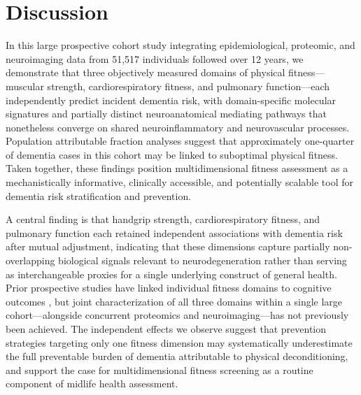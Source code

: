 \documentclass{article}
\begin{document}
\section*{Discussion}

In this large prospective cohort study integrating epidemiological, 
proteomic, and neuroimaging data from 51,517 individuals followed over 
12 years, we demonstrate that three objectively measured domains of 
physical fitness—muscular strength, cardiorespiratory fitness, and 
pulmonary function—each independently predict incident dementia risk, 
with domain-specific molecular signatures and partially distinct 
neuroanatomical mediating pathways that nonetheless converge on shared 
neuroinflammatory and neurovascular processes. Population attributable 
fraction analyses suggest that approximately one-quarter of dementia 
cases in this cohort may be linked to suboptimal physical fitness. 
Taken together, these findings position multidimensional fitness 
assessment as a mechanistically informative, clinically accessible, 
and potentially scalable tool for dementia risk stratification and 
prevention.

A central finding is that handgrip strength, cardiorespiratory fitness, and 
pulmonary function each retained independent associations with dementia 
risk after mutual adjustment, indicating that these dimensions capture 
partially non-overlapping biological signals relevant to neurodegeneration 
rather than serving as interchangeable proxies for a single underlying 
construct of general health.
Prior prospective studies have linked individual fitness domains to 
cognitive outcomes \citep{esteban2022handgrip, blondell2014protective, 
kodama2009cardiorespiratory}, but joint characterization of all three 
domains within a single large cohort—alongside concurrent proteomics and 
neuroimaging—has not previously been achieved.
The independent effects we observe suggest that prevention strategies 
targeting only one fitness dimension may systematically underestimate the 
full preventable burden of dementia attributable to physical 
deconditioning, and support the case for multidimensional fitness 
screening as a routine component of midlife health assessment.
\end{document}
